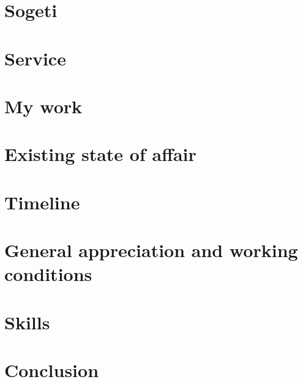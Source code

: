 \documentclass[a4paper, 12pt]{report}
\begin{document}
\section*{Sogeti}
\section*{Service}
\section*{My work}
\section*{Existing state of affair}
\section*{Timeline}
\section*{General appreciation and working conditions}
\section*{Skills}
\section*{Conclusion}
\end{document}
